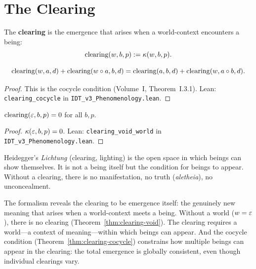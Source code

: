 \section{The Clearing}

\begin{definition}
\label{def:clearing}
The \textbf{clearing} is the emergence that arises when a world-context
encounters a being:
\[
\mathrm{clearing}(w, b, p) := \kappa(w, b, p).
\]
\end{definition}

\begin{theorem}
\label{thm:clearing-cocycle}
\[
\mathrm{clearing}(w, a, d) + \mathrm{clearing}(w \circ a, b, d)
= \mathrm{clearing}(a, b, d) + \mathrm{clearing}(w, a \circ b, d).
\]
\end{theorem}

\begin{proof}
This is the cocycle condition (Volume~I, Theorem~I.3.1).
Lean: \texttt{clearing\_cocycle} in \texttt{IDT\_v3\_Phenomenology.lean}.
\end{proof}

\begin{theorem}
\label{thm:clearing-void}
$\mathrm{clearing}(\varepsilon, b, p) = 0$ for all $b, p$.
\end{theorem}

\begin{proof}
$\kappa(\varepsilon, b, p) = 0$.
Lean: \texttt{clearing\_void\_world} in \texttt{IDT\_v3\_Phenomenology.lean}.
\end{proof}

\begin{interpretation}
\label{interp:clearing}
Heidegger's \textit{Lichtung} (clearing, lighting) is the open space in which
beings can show themselves. It is not a being itself but the condition for
beings to appear. Without a clearing, there is no manifestation, no truth
(\textit{aletheia}), no unconcealment.

The formalism reveals the clearing to be emergence itself: the genuinely new
meaning that arises when a world-context meets a being. Without a world
($w = \varepsilon$), there is no clearing (Theorem~\ref{thm:clearing-void}). The
clearing requires a world---a context of meaning---within which beings can
appear. And the cocycle condition
(Theorem~\ref{thm:clearing-cocycle}) constrains how multiple beings can
appear in the clearing: the total emergence is globally consistent, even though
individual clearings vary.
\end{interpretation}

